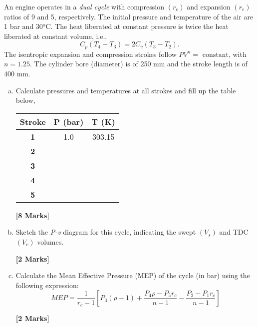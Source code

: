 \documentclass[calculator,refrigeranttables,datasheet,resit]{exam}
\newcommand{\frc}{\displaystyle\frac}
\begin{document}
\begin{question}

An engine operates in a {\it dual cycle} with compression $\left(r_{c}\right)$ and expansion $\left(r_{e}\right)$ ratios of 9 and 5, respectively. The initial pressure and temperature of the air are 1 bar and 30$^{\text{o}}$C. The heat liberated at constant pressure is twice the heat liberated at constant volume, i.e.,
\begin{displaymath}
C_{p}\left(T_{4}-T_{3}\right)=2 C_{v}\left(T_{3}-T_{2}\right).
\end{displaymath}
The isentropic expansion and compression strokes follow $PV^{n}=\text{ constant}$, with $n=1.25$. The cylinder bore (diameter) is of 250 mm and the stroke length is of 400 mm. 
\begin{enumerate}[(a)]

\item Calculate pressures and temperatures at all strokes and fill up the table below,
\begin{center}
\begin{tabular}{||c |c |c ||}
\hline \hline
 {\bf Stroke}  &  {\bf P (bar)}   &  {\bf T (K)} \\
\hline\hline
{\bf 1 }       &     1.0          &    303.15    \\
\hline         
{\bf 2 }       &                  &             \\
\hline         
{\bf 3 }       &                  &             \\
\hline         
{\bf 4 }       &                  &             \\
\hline         
{\bf 5 }       &                  &             \\
\hline\hline         
\end{tabular}
\end{center}
\begin{flushright}
{\bf [8 Marks]}
\end{flushright}
\item Sketch the {\it P-v} diagram for this cycle, indicating the swept $\left(V_{s}\right)$ and TDC $\left(V_{c}\right)$ volumes.
\begin{flushright}
{\bf [2 Marks]}
\end{flushright} 

\item Calculate the Mean Effective Pressure (MEP) of the cycle (in bar) using the following expression:
\begin{displaymath}
MEP = \frc{1}{r_{c}-1} \left[ P_{3}\left(\rho-1\right) + \frc{P_{4}\rho-P_{5}r_{c}}{n-1} - \frc{P_{2}-P_{1}r_{c}}{n-1}\right]
\end{displaymath}
\begin{flushright}
{\bf [2 Marks]}
\end{flushright}


\end{enumerate}
\end{question}
\end{document}
